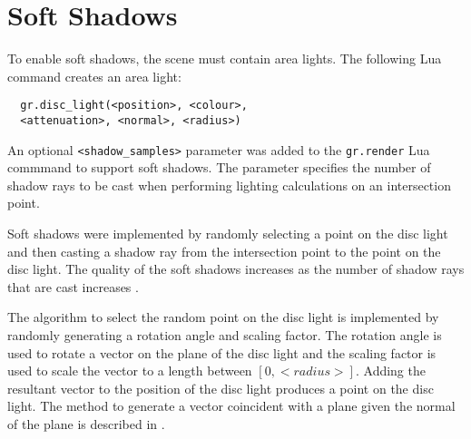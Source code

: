 \section{Soft Shadows}

To enable soft shadows, the scene must contain area lights. The following Lua 
command creates an area light:
\begin{lstlisting}
  gr.disc_light(<position>, <colour>, 
  <attenuation>, <normal>, <radius>)
\end{lstlisting}
  
An optional \verb|<shadow_samples>| parameter was added to the \newline
\verb|gr.render| Lua commmand to support soft shadows. The parameter specifies 
the number of shadow rays to be cast when performing lighting calculations on 
an intersection point.

Soft shadows were implemented by randomly selecting a point on the disc light
and then casting a shadow ray from the intersection point to the point on the
disc light. The quality of the soft shadows increases as the number of shadow
rays that are cast increases \cite{12_shirley_marschner_2009}.

The algorithm to select the random point on the disc light is implemented by
randomly generating a rotation angle and scaling factor. The rotation angle is
used to rotate a vector on the plane of the disc light and the scaling factor is 
used to scale the vector to a length between $[0, <radius>]$. Adding the 
resultant vector to the position of the disc light produces a point on the disc
light. The method to generate a vector coincident with a plane given the normal
of the plane is described in \cite{6_hughes_möller_2005}.

